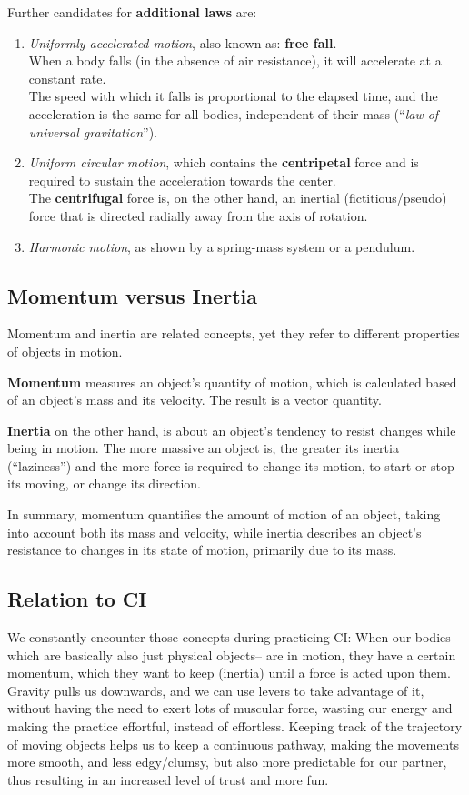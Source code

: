 Further candidates for \textbf{additional laws} are:
\begin{enumerate}
    \item \textit{Uniformly accelerated motion}, also known as: \textbf{free fall}. \\
    When a body falls (in the absence of air resistance), it will accelerate at a constant rate. \\
    The speed with which it falls is proportional to the elapsed time, and the acceleration is the same for all bodies, independent of their mass (``\textit{law of universal gravitation}'').
    \item \textit{Uniform circular motion}, which contains the \textbf{centripetal} force and is required to sustain the acceleration towards the center. \\
    The \textbf{centrifugal} force is, on the other hand, an inertial (fictitious/pseudo) force that is directed radially away from the axis of rotation.
    \item \textit{Harmonic motion}, as shown by a spring-mass system or a pendulum.
\end{enumerate}

\subsection{Momentum versus Inertia}\label{subsec:momentum-versus-inertia}

Momentum and inertia are related concepts, yet they refer to different properties of objects in motion.

\textbf{Momentum} measures an object's quantity of motion, which is calculated based of an object's mass and its velocity.
The result is a vector quantity.

\textbf{Inertia} on the other hand, is about an object's tendency to resist changes while being in motion.
The more massive an object is, the greater its inertia (``laziness'') and the more force is required to change its motion, to start or stop its moving, or change its direction.

In summary, momentum quantifies the amount of motion of an object, taking into account both its mass and velocity, while inertia describes an object's resistance to changes in its state of motion, primarily due to its mass.

\subsection{Relation to CI}\label{subsec:relation-to-ci}

We constantly encounter those concepts during practicing CI: When our bodies --which are basically also just physical objects-- are in motion, they have a certain momentum, which they want to keep (inertia) until a force is acted upon them.
Gravity pulls us downwards, and we can use levers to take advantage of it, without having the need to exert lots of muscular force, wasting our energy and making the practice effortful, instead of effortless.
Keeping track of the trajectory of moving objects helps us to keep a continuous pathway, making the movements more smooth, and less edgy/clumsy, but also more predictable for our partner, thus resulting in an increased level of trust and more fun.
